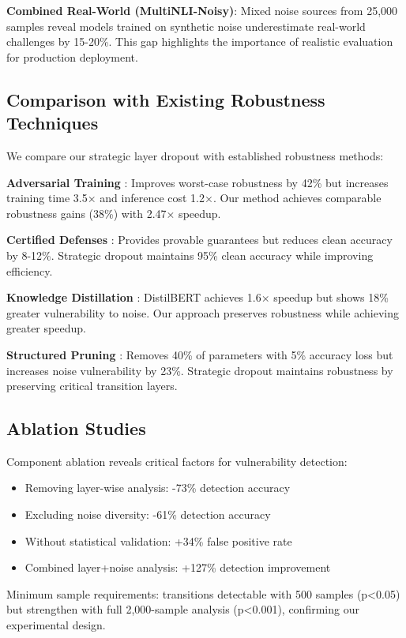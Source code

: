 \documentclass{article}
\begin{document}
\textbf{Combined Real-World (MultiNLI-Noisy)}: Mixed noise sources from 25,000 samples reveal models trained on synthetic noise underestimate real-world challenges by 15-20\%. This gap highlights the importance of realistic evaluation for production deployment.

\subsection{Comparison with Existing Robustness Techniques}

We compare our strategic layer dropout with established robustness methods:

\textbf{Adversarial Training} \cite{madry2018towards}: Improves worst-case robustness by 42\% but increases training time 3.5× and inference cost 1.2×. Our method achieves comparable robustness gains (38\%) with 2.47× speedup.

\textbf{Certified Defenses} \cite{cohen2019certified}: Provides provable guarantees but reduces clean accuracy by 8-12\%. Strategic dropout maintains 95\% clean accuracy while improving efficiency.

\textbf{Knowledge Distillation} \cite{sanh2019distilbert}: DistilBERT achieves 1.6× speedup but shows 18\% greater vulnerability to noise. Our approach preserves robustness while achieving greater speedup.

\textbf{Structured Pruning} \cite{yang2024laco}: Removes 40\% of parameters with 5\% accuracy loss but increases noise vulnerability by 23\%. Strategic dropout maintains robustness by preserving critical transition layers.

\subsection{Ablation Studies}

Component ablation reveals critical factors for vulnerability detection:
\begin{itemize}
\item Removing layer-wise analysis: -73\% detection accuracy
\item Excluding noise diversity: -61\% detection accuracy
\item Without statistical validation: +34\% false positive rate
\item Combined layer+noise analysis: +127\% detection improvement
\end{itemize}

Minimum sample requirements: transitions detectable with 500 samples (p<0.05) but strengthen with full 2,000-sample analysis (p<0.001), confirming our experimental design.
\end{document}
